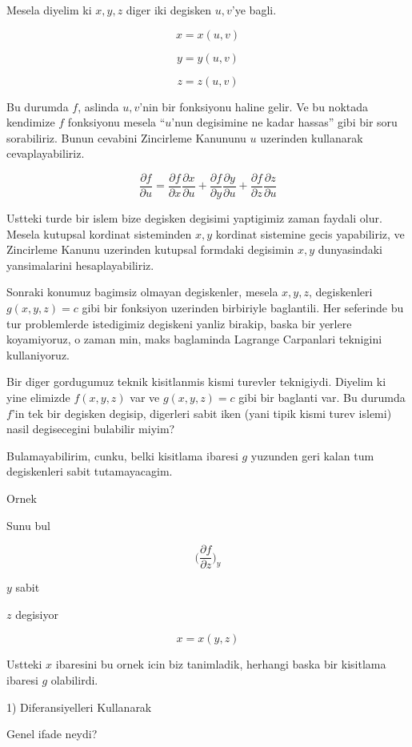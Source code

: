 \documentclass[12pt,fleqn]{article}
\begin{document}
Mesela diyelim ki $x,y,z$ diger iki degisken $u,v$'ye bagli. 

\[ x = x(u,v) \]

\[ y = y(u,v) \]

\[ z = z(u,v) \]

Bu durumda $f$, aslinda $u,v$'nin bir fonksiyonu haline gelir. Ve bu
noktada kendimize $f$ fonksiyonu mesela ``$u$'nun degisimine ne kadar
hassas'' gibi bir soru sorabiliriz. Bunun cevabini Zincirleme Kanununu $u$
uzerinden kullanarak cevaplayabiliriz. 

\[ 
\frac{\partial f}{\partial u} = 
\frac{\partial f}{\partial x}\frac{\partial x}{\partial u} + 
\frac{\partial f}{\partial y}\frac{\partial y}{\partial u} + 
\frac{\partial f}{\partial z}\frac{\partial z}{\partial u} 
 \]

Ustteki turde bir islem bize degisken degisimi yaptigimiz zaman faydali
olur. Mesela kutupsal kordinat sisteminden $x,y$ kordinat sistemine gecis
yapabiliriz, ve Zincirleme Kanunu uzerinden kutupsal formdaki degisimin $x,y$
dunyasindaki yansimalarini hesaplayabiliriz. 

Sonraki konumuz bagimsiz olmayan degiskenler, mesela $x,y,z$, degiskenleri
$g(x,y,z)=c$ gibi bir fonksiyon uzerinden birbiriyle baglantili. Her
seferinde bu tur problemlerde istedigimiz degiskeni yanliz birakip, baska
bir yerlere koyamiyoruz, o zaman min, maks baglaminda Lagrange Carpanlari
teknigini kullaniyoruz.

Bir diger gordugumuz teknik kisitlanmis kismi turevler teknigiydi. Diyelim
ki yine elimizde $f(x,y,z)$ var ve $g(x,y,z)=c$ gibi bir baglanti var. Bu
durumda $f$'in tek bir degisken degisip, digerleri sabit iken (yani tipik
kismi turev islemi) nasil degisecegini bulabilir miyim? 

Bulamayabilirim, cunku, belki kisitlama ibaresi $g$ yuzunden geri kalan tum
degiskenleri sabit tutamayacagim.

Ornek 

Sunu bul

\[ 
\bigg( 
\frac{\partial f}{\partial z}
\bigg)_{y}
 \]

$y$ sabit

$z$ degisiyor

\[ x = x(y,z) \]

Ustteki $x$ ibaresini bu ornek icin biz tanimladik, herhangi baska bir
kisitlama ibaresi $g$ olabilirdi. 

1) Diferansiyelleri Kullanarak

Genel ifade neydi?
\end{document}
